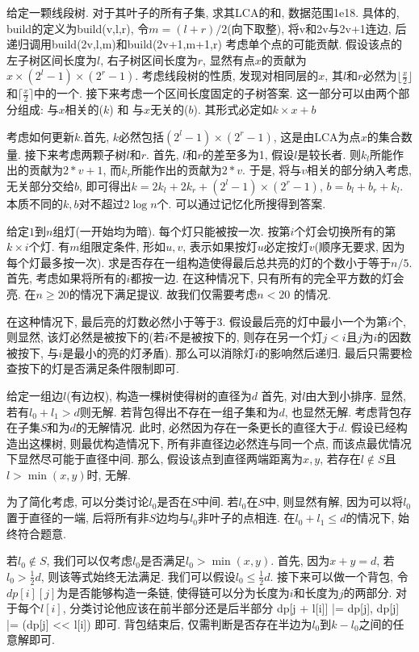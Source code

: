 \prob 给定一颗线段树. 对于其叶子的所有子集, 求其LCA的和, 数据范围1e18. 具体的, build的定义为build(v,l,r), 令$m = (l+r)/2$(向下取整), 将v和2v与2v+1连边, 后递归调用build(2v,l,m)和build(2v+1,m+1,r)
\sol  考虑单个点的可能贡献. 假设该点的左子树区间长度为$l$, 右子树区间长度为$r$, 显然有点$x$的贡献为$x \times (2^l - 1) \times (2^r - 1)$. 考虑线段树的性质, 发现对相同层的$x$, 其$l$和$r$必然为$\lfloor{\frac{x}{2}}\rfloor$和$\lceil{\frac{x}{2}}\rceil$中的一个. 接下来考虑一个区间长度固定的子树答案. 这一部分可以由两个部分组成: 与$x$相关的($k$) 和 与$x$无关的($b$). 其形式必定如$k\times x + b$

考虑如何更新$k$.首先, $k$必然包括$(2^l-1) \times (2^r - 1)$, 这是由LCA为点$x$的集合数量. 接下来考虑两颗子树$l$和$r$. 首先, $l$和$r$的差至多为1, 假设$l$是较长者. 则$k_l$所能作出的贡献为$2 * v + 1$, 而$k_r$所能作出的贡献为$2 * v$. 于是, 将与$v$相关的部分纳入考虑, 无关部分交给$b$, 即可得出$k = 2k_l + 2k_r + (2^{l}-1) \times (2^{r} - 1)$, $b = b_l + b_r + k_l$. 本质不同的$k,b$对不超过$2\log{n}$个. 可以通过记忆化所搜得到答案.

\prob 给定$1$到$n$组灯(一开始均为暗). 每个灯只能被按一次. 按第$i$个灯会切换所有的第$k \times i$个灯. 有$m$组限定条件, 形如$u, v$, 表示如果按灯$u$必定按灯$v$(顺序无要求, 因为每个灯最多按一次). 求是否存在一组构造使得最后总共亮的灯的个数小于等于$n / 5$.
\sol 首先, 考虑如果将所有的$i$都按一边. 在这种情况下, 只有所有的完全平方数的灯会亮. 在$n \geq 20$的情况下满足提议. 故我们仅需要考虑$n < 20$ 的情况.

在这种情况下, 最后亮的灯数必然小于等于$3$. 假设最后亮的灯中最小一个为第$i$个, 则显然, 该灯必然是被按下的(若$i$不是被按下的, 则存在另一个灯$j < i$且$j$为$i$的因数被按下, 与$i$是最小的亮的灯矛盾). 那么可以消除灯$i$的影响然后递归. 最后只需要检查按下的灯是否满足条件限制即可.

\prob 给定一组边$l$(有边权), 构造一棵树使得树的直径为$d$
\sol 首先, 对$l$由大到小排序. 显然, 若有$l_0 + l_1 > d$则无解. 若背包得出不存在一组子集和为$d$, 也显然无解. 考虑背包存在子集$S$和为$d$的无解情况. 此时, 必然因为存在一条更长的直径大于$d$. 假设已经构造出这棵树, 则最优构造情况下, 所有非直径边必然连与同一个点, 而该点最优情况下显然尽可能于直径中间. 那么, 假设该点到直径两端距离为$x, y$, 若存在$l \not \in S$且$l > \min(x,y)$时, 无解.

为了简化考虑, 可以分类讨论$l_0$是否在$S$中间. 若$l_0$在$S$中, 则显然有解, 因为可以将$l_0$置于直径的一端, 后将所有非$S$边均与$l_0$非叶子的点相连. 在$l_0 + l_1 \leq d$的情况下, 始终符合题意.

若$l_0 \not \in S$, 我们可以仅考虑$l_0$是否满足$l_0 > \min(x,y)$. 首先, 因为$x + y = d$, 若$l_0 > \frac{1}{2} d$, 则该等式始终无法满足. 我们可以假设$l_0 \leq \frac{1}{2}d$. 接下来可以做一个背包, 令$dp[i][j]$为是否能够构造一条链, 使得链可以分为长度为$i$和长度为$j$的两部分. 对于每个$l[i]$, 分类讨论他应该在前半部分还是后半部分 dp[j + l[i]] |= dp[j], dp[j] |= (dp[j] << l[i]) 即可. 背包结束后, 仅需判断是否存在半边为$l_0$到$k - l_0$之间的任意解即可.